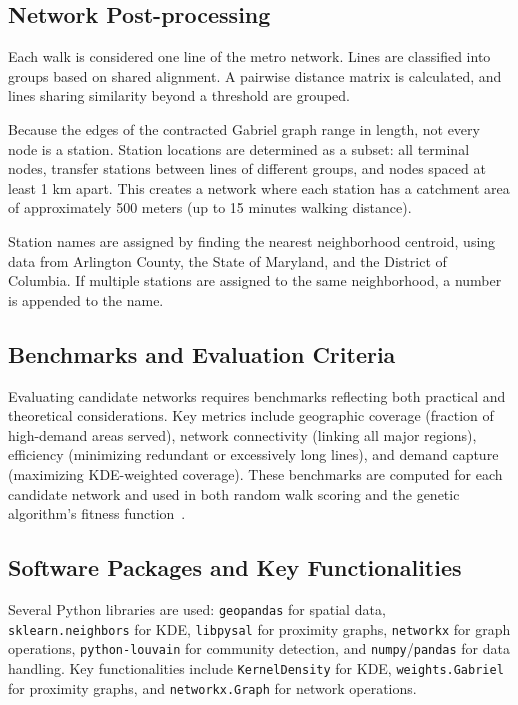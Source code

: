 \documentclass[manuscript]{acmart}
\begin{document}
\subsection{Network Post-processing}
Each walk is considered one line of the metro network. Lines are classified into groups based on shared alignment. A pairwise distance matrix is calculated, and lines sharing similarity beyond a threshold are grouped.

Because the edges of the contracted Gabriel graph range in length, not every node is a station. Station locations are determined as a subset: all terminal nodes, transfer stations between lines of different groups, and nodes spaced at least 1 km apart. This creates a network where each station has a catchment area of approximately 500 meters (up to 15 minutes walking distance).

Station names are assigned by finding the nearest neighborhood centroid, using data from Arlington County, the State of Maryland, and the District of Columbia. If multiple stations are assigned to the same neighborhood, a number is appended to the name.

\subsection{Benchmarks and Evaluation Criteria}
Evaluating candidate networks requires benchmarks reflecting both practical and theoretical considerations. Key metrics include geographic coverage (fraction of high-demand areas served), network connectivity (linking all major regions), efficiency (minimizing redundant or excessively long lines), and demand capture (maximizing KDE-weighted coverage). These benchmarks are computed for each candidate network and used in both random walk scoring and the genetic algorithm's fitness function~\cite{bib:bast2016route, bib:overview-field}.

\subsection{Software Packages and Key Functionalities}
Several Python libraries are used: \texttt{geopandas} for spatial data, \texttt{sklearn.neighbors} for KDE, \texttt{libpysal} for proximity graphs, \texttt{networkx} for graph operations, \texttt{python-louvain} for community detection, and \texttt{numpy}/\texttt{pandas} for data handling. Key functionalities include \texttt{KernelDensity} for KDE, \texttt{weights.Gabriel} for proximity graphs, and \texttt{networkx.Graph} for network operations.
\end{document}
